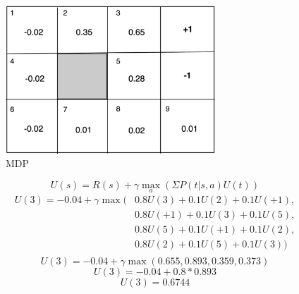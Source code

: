 \documentclass[paper=a4, fontsize=11pt]{scrartcl} %
\begin{document}
\begin{figure}[hp]
  \centering
  \includegraphics[width=0.7\textwidth]{mdp_utility.png}
  \caption{MDP}
  \label{fig:mdpu}
\end{figure}

$$U(s) = R(s) + \gamma\max_a(\Sigma P(t|s,a)U(t))$$
\[
\begin{split}
  U(3) = -0.04 + \gamma\max(& 0.8U(3)+0.1U(2)+0.1U(+1),\\
  & 0.8U(+1)+0.1U(3)+0.1U(5),\\
  & 0.8U(5)+0.1U(+1)+0.1U(2),\\
  & 0.8U(2)+0.1U(5)+0.1U(3))\\
\end{split}
\]
$$U(3) = -0.04 + \gamma\max(0.655, 0.893, 0.359, 0.373)$$
$$U(3) = -0.04 + 0.8 * 0.893$$
$$U(3) = 0.6744$$

\pagebreak
\end{document}
